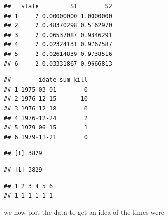 \documentclass[]{article}
\begin{document}
\begin{verbatim}
##   state         S1        S2
## 1     2 0.00000000 1.0000000
## 2     2 0.48370298 0.5162970
## 3     2 0.06537087 0.9346291
## 4     2 0.02324131 0.9767587
## 5     2 0.02614839 0.9738516
## 6     2 0.03331867 0.9666813
\end{verbatim}

\begin{verbatim}
##        idate sum_kill
## 1 1975-03-01        0
## 2 1976-12-15       10
## 3 1976-12-18        0
## 4 1976-12-24        2
## 5 1979-06-15        1
## 6 1979-11-21        0
\end{verbatim}

\begin{verbatim}
## [1] 3829
\end{verbatim}

\begin{verbatim}
## [1] 3829
\end{verbatim}

\begin{verbatim}
## 1 2 3 4 5 6 
## 1 1 1 1 1 1
\end{verbatim}

we now plot the data to get an idea of the times were


\end{document}
